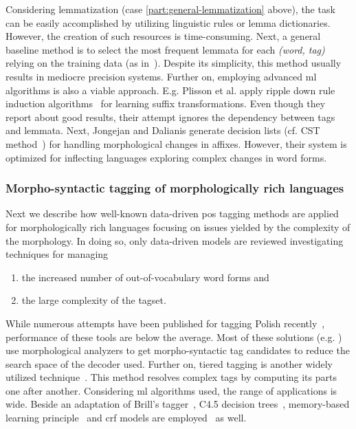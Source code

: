 Considering lemmatization (case \ref{part:general-lemmatization} above), the task can be easily accomplished by utilizing linguistic rules or lemma dictionaries. 
However, the creation of such resources is time-consuming.
Next, a general baseline method is to select the most frequent lemmata for each \emph{(word, tag)} relying on the training data (as in~\cite{zsibrata2013magyarlanc}). 
Despite its simplicity, this method usually results in mediocre precision systems.
Further on, employing advanced \gls{ml} algorithms is also a viable approach.
E.g. Plisson et al. apply ripple down rule induction algorithms~\cite{Plisson2004} for learning suffix transformations.
Even though they report about good results, their attempt ignores the dependency between tags and lemmata.
Next, Jongejan and Dalianis generate decision lists (cf. CST method~\cite{Jongejan}) for handling morphological changes in affixes.
However, their system is optimized for inflecting languages exploring complex changes in word forms.  

\subsubsection{Morpho-syntactic tagging of morphologically rich languages}

Next we describe how well-known data-driven \gls{pos} tagging methods are applied for morphologically rich languages focusing on issues yielded by the complexity of the morphology.
In doing so, only data-driven models are reviewed investigating techniques for managing
\begin{enumerate}
  \item the increased number of out-of-vocabulary word forms and
  \item the large complexity of the tagset. 
\end{enumerate}

While numerous attempts have been published for tagging Polish recently~\cite{Piasecki2006,Piasecki2007,Acedanski2010,Radziszewski2013},  performance of these tools are below the average.
Most of these solutions (e.g. \cite{Radziszewski2013}) use morphological analyzers to get morpho-syntactic tag candidates to reduce the search space of the decoder used.
Further on, tiered tagging is another widely utilized technique~\cite{Radziszewski2013}.
This method resolves complex tags by computing its parts one after another.
Considering \acrshort{ml} algorithms used, the range of applications is wide.
Beside an adaptation of Brill’s tagger~\cite{Acedanski2010}, C4.5 decision trees~\cite{Piasecki2007}, memory-based learning principle~\cite{Radziszewski2011} and \acrshort{crf} models are employed~\cite{Radziszewski2013} as well. 

